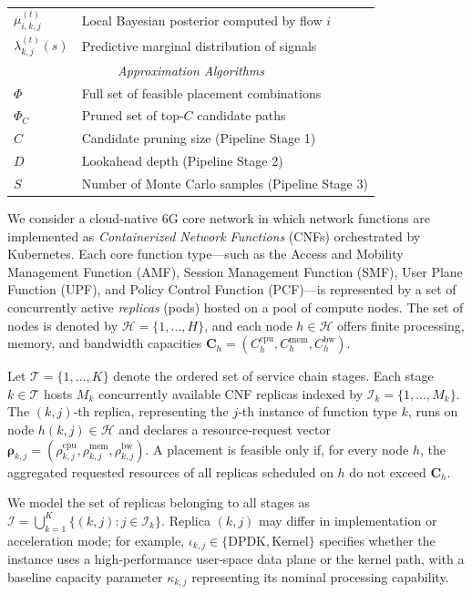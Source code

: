 \documentclass[journal]{IEEEtran}
\theoremstyle{plain}
\theoremstyle{definition}
\theoremstyle{remark}
\begin{document}
\begin{table}[!t]
\begin{tabular}{l p{6cm}}
$\mu_{i,k,j}^{(t)}$ & Local Bayesian posterior computed by flow $i$ \\
$\lambda_{k,j}^{(t)}(s)$ & Predictive marginal distribution of signals \\
\midrule
\multicolumn{2}{c}{\textit{Approximation Algorithms}} \\
\midrule
$\Phi$ & Full set of feasible placement combinations \\
$\Phi_C$ & Pruned set of top-$C$ candidate paths \\
$C$ & Candidate pruning size (Pipeline Stage 1) \\
$D$ & Lookahead depth (Pipeline Stage 2) \\
$S$ & Number of Monte Carlo samples (Pipeline Stage 3) \\
\bottomrule
\end{tabular}
\end{table}

We consider a cloud‑native 6G core network in which network functions are implemented as \emph{Containerized Network Functions} (CNFs) orchestrated by Kubernetes. Each core function type—such as the Access and Mobility Management Function (AMF), Session Management Function (SMF), User Plane Function (UPF), and Policy Control Function (PCF)—is represented by a set of concurrently active \emph{replicas} (pods) hosted on a pool of compute nodes. The set of nodes is denoted by $\mathcal{H}=\{1,\dots,H\}$, and each node $h\in\mathcal{H}$ offers finite processing, memory, and bandwidth capacities $\mathbf{C}_h=(C_h^{\mathrm{cpu}},C_h^{\mathrm{mem}},C_h^{\mathrm{bw}})$.

Let $\mathcal{T}=\{1,\dots,K\}$ denote the ordered set of service chain stages. Each stage $k\in\mathcal{T}$ hosts $M_k$ concurrently available CNF replicas indexed by $\mathcal{I}_k=\{1,\dots,M_k\}$. The $(k,j)$‑th replica, representing the $j$‑th instance of function type $k$, runs on node $h(k,j)\in\mathcal{H}$ and declares a resource‑request vector $\boldsymbol{\rho}_{k,j}=(\rho_{k,j}^{\mathrm{cpu}},\rho_{k,j}^{\mathrm{mem}}, \rho_{k,j}^{\mathrm{bw}})$. A placement is feasible only if, for every node $h$, the aggregated requested resources of all replicas scheduled on $h$ do not exceed $\mathbf{C}_h$.

We model the set of replicas belonging to all stages as $\mathcal{I}=\bigcup_{k=1}^{K}\{(k,j):j\in\mathcal{I}_k\}$. Replica $(k,j)$ may differ in implementation or acceleration mode; for example, $\iota_{k,j}\in\{\text{DPDK},\text{Kernel}\}$ specifies whether the instance uses a high‑performance user‑space data plane or the kernel path, with a baseline capacity parameter $\kappa_{k,j}$ representing its nominal processing capability.
\end{document}
